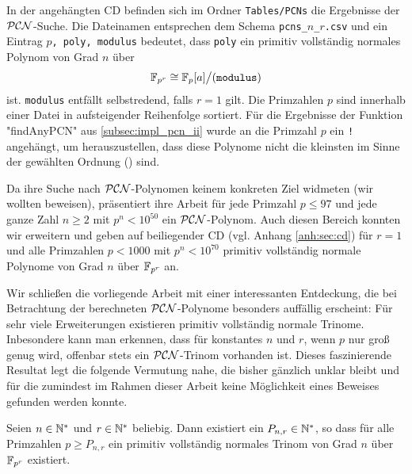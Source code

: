 In der angehängten CD befinden sich im Ordner \texttt{Tables/PCNs} die 
Ergebnisse der $\mathcal{PCN}$-Suche. Die Dateinamen entsprechen dem Schema 
\texttt{pcns\_$n$\_$r$.csv}
und ein Eintrag \texttt{$p$, poly, modulus} bedeutet, dass
\texttt{poly} ein primitiv vollständig normales Polynom von Grad $n$ über 
\[ \mathbb{F}_{p^r} \cong \mathbb{F}_p[a]\big/(\texttt{modulus}) \]
ist. \texttt{modulus} entfällt selbstredend, falls $r = 1$ gilt. Die Primzahlen
$p$ sind innerhalb einer Datei in aufsteigender Reihenfolge sortiert.
Für die Ergebnisse der Funktion "findAnyPCN" aus \autoref{subsec:impl_pcn_ii}
wurde an die Primzahl $p$ ein \texttt{!} angehängt, um herauszustellen, dass
diese Polynome nicht die kleinsten im Sinne der gewählten Ordnung 
() sind.

Da \citeauthor{morgan1996} ihre Suche nach $\mathcal{PCN}$-Polynomen keinem
konkreten Ziel widmeten (wir wollten  beweisen),
präsentiert ihre Arbeit 
für jede Primzahl $p\leq 97$ und jede ganze Zahl $n \geq 2$ mit
$p^n < 10^{50}$ ein $\mathcal{PCN}$-Polynom. Auch diesen Bereich konnten wir erweitern
und geben auf beiliegender CD (vgl. Anhang \ref{anh:sec:cd}) 
für $r = 1$ und alle Primzahlen $p < 1000$ mit $p^n < 10^{70}$
primitiv vollständig normale Polynome von Grad $n$ über
$\mathbb{F}_{p^r}$ an.



Wir schließen die vorliegende Arbeit mit einer interessanten Entdeckung, die
bei Betrachtung der berechneten $\mathcal{PCN}$-Polynome besonders auffällig
erscheint:
Für sehr viele Erweiterungen existieren primitiv vollständig normale Trinome. 
Inbesondere kann man erkennen, dass 
für konstantes $n$ und $r$, wenn $p$ nur groß genug wird,
offenbar stets ein $\mathcal{PCN}$-Trinom vorhanden ist. Dieses faszinierende Resultat 
legt die folgende Vermutung nahe, die bisher gänzlich unklar bleibt und für die 
zumindest im Rahmen dieser Arbeit keine Möglichkeit eines 
Beweises gefunden werden konnte.

\begin{vermutung}
  Seien $n\in \mathbb{N}^\ast$ und $r\in \mathbb{N}^\ast$ beliebig.
  Dann existiert ein $P_{n,r}\in \mathbb{N}^\ast$, so dass für alle
  Primzahlen $p \geq P_{n,r}$ 
  ein primitiv vollständig normales Trinom von Grad
  $n$ über $\mathbb{F}_{p^r}$ existiert.
\end{vermutung}
